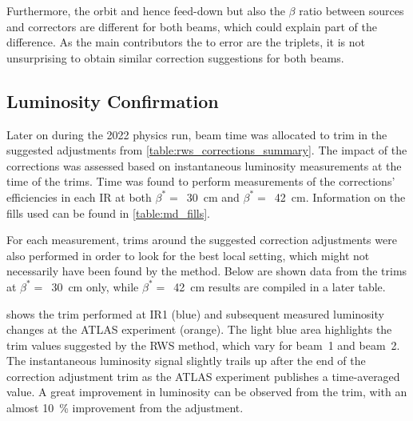 Furthermore, the orbit and hence feed-down but also the \(\beta\) ratio between sources and correctors are different for both beams, which could explain part of the difference.
As the main contributors the to error are the triplets, it is not unsurprising to obtain similar correction suggestions for both beams.


\subsection{Luminosity Confirmation}
\label{subsection:lumi_correction_trims}

Later on during the \num{2022} physics run, beam time was allocated to trim in the suggested adjustments from \cref{table:rws_corrections_summary}.
The impact of the corrections was assessed based on instantaneous luminosity measurements at the time of the trims.
Time was found to perform measurements of the corrections' efficiencies in each IR at both \(\beta^{\ast} =\)~\qty{30}{\centi\meter} and \(\beta^{\ast} =\)~\qty{42}{\centi\meter}.
Information on the fills used can be found in \cref{table:md_fills}.

For each measurement, trims around the suggested correction adjustments were also performed in order to look for the best local setting, which might not necessarily have been found by the method.
Below are shown data from the trims at \(\beta^{\ast} =\)~\qty{30}{\centi\meter} only, while \(\beta^{\ast} =\)~\qty{42}{\centi\meter} results are compiled in a later table.
\newline

 shows the trim performed at IR\num{1} (\textcolor{mplblue}{blue}) and subsequent measured luminosity changes at the ATLAS experiment (\textcolor{mplorange}{orange}).
The light blue area highlights the trim values suggested by the RWS method, which vary for beam~\num{1} and beam~\num{2}.
The instantaneous luminosity signal slightly trails up after the end of the correction adjustment trim as the ATLAS experiment publishes a time-averaged value.
A great improvement in luminosity can be observed from the trim, with an almost \qty{10}{\percent} improvement from the adjustment.

